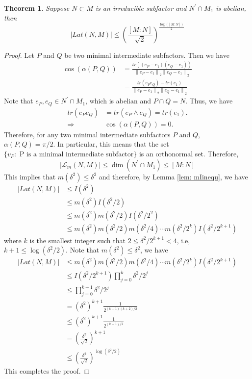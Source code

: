 \documentclass[11pt,letterpaper]{amsart}
\newtheorem{theorem}{Theorem}[section]
\theoremstyle{definition}
\theoremstyle{remark}
\begin{document}
\begin{theorem}\label{thm:abSecRc}
	Suppose $N\subset M$ is an irreducible subfactor and $N^\prime\cap M_1$ is abelian, then 
	\begin{equation*}
	\vert Lat(N,M)\vert\leq (\frac{[M:N]}{\sqrt{2}})^{\frac{\log([M:N])}{2}}
	\end{equation*}
\end{theorem}
\begin{proof}
	Let $P$ and $Q$ be two minimal intermediate subfactors. Then we have 
	\begin{align*}
	\cos(\alpha(P,Q))&=\frac{tr((e_P-e_1)(e_Q-e_1))}{{\lVert e_P-e_1\rVert}_2{\lVert e_Q-e_1\rVert}_2}\\
	&=\frac{tr(e_Pe_Q)-tr(e_1)}{{\lVert e_P-e_1\rVert}_2{\lVert e_Q-e_1\rVert}_2}
	\end{align*}
	Note that $e_P,e_Q\in N^\prime\cap M_1$, which is abelian and $P\cap Q=N$. Thus, we have
	\begin{align*}
	tr(e_Pe_Q)&=tr(e_P\wedge e_Q)=tr(e_1).\\
	\Rightarrow&\cos(\alpha(P,Q))=0.
	\end{align*}
	Therefore, for any two minimal intermediate subfactors $P$ and $Q$, $\alpha(P,Q)=\pi/2$. In particular, this means that the set $\{v_P:\text{ P is a minimal intermediate subfactor}\}$ is an orthonormal set. Therefore, 
	\begin{equation*}
	\vert \mathcal{L}_m(N,M)\vert\leq \dim (N^\prime\cap M_1)\leq [M:N]
	\end{equation*}
	This implies that $m(\delta^2)\leq \delta^2$ and therefore, by Lemma \ref{lem: mIinequ}, we have
	\begin{align*}
	\vert Lat(N,M)\vert&\leq I(\delta^2)\\
	&\leq m(\delta^2)I(\delta^2/2)\\
	&\leq m(\delta^2)m(\delta^2/2)I(\delta^2/2^2)\\
	&\leq m(\delta^2)m(\delta^2/2)m(\delta^2/4)\cdots m(\delta^2/2^k)I(\delta^2/2^{k+1})
	\end{align*}
	where $k$ is the smallest integer such that $2\leq \delta^2/2^{k+1} < 4$, i.e, $k+1\leq\log(\delta^2/2)$. Note that $m(\delta^2)\leq \delta^2$, we have
	\begin{align*}
	\vert Lat(N,M)\vert&\leq m(\delta^2)m(\delta^2/2)m(\delta^2/4)\cdots m(\delta^2/2^k)I(\delta^2/2^{k+1})\\
	&\leq I(\delta^2/2^{k+1}) \displaystyle\prod_{j=0}^{k} \delta^2/2^j\\
	&\leq \displaystyle\prod_{j=0}^{k+1}\delta^2/2^j\\
	&=(\delta^2)^{k+1}\displaystyle\frac{1}{2^{(k+1)(k+2)/2}}\\
	&\leq (\delta^2)^{k+1}\displaystyle\frac{1}{2^{(k+1)/2}}\\
	&=(\displaystyle\frac{\delta^2}{\sqrt{2}})^{k+1}\\
	&\leq (\frac{\delta^2}{\sqrt{2}})^{\log(\delta^2/2)}
	\end{align*}
	This completes the proof.
\end{proof}




\end{document}
